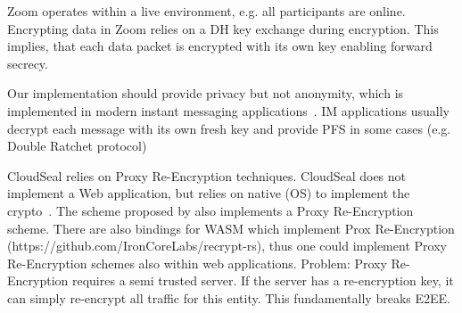 \documentclass[../main.tex]{subfiles}
\begin{document}
Zoom operates within a live environment, e.g. all participants are online. 
Encrypting data in Zoom relies on a DH key exchange during encryption. 
This implies, that each data packet is encrypted with its own key enabling forward secrecy.~\cite{Isobe2021}

Our implementation should provide privacy but not anonymity, which is implemented in modern instant messaging applications~\cite{Akinbi2021}. 
IM applications usually decrypt each message with its own fresh key and provide PFS in some cases (e.g. Double Ratchet protocol)

CloudSeal relies on Proxy Re-Encryption techniques.
CloudSeal does not implement a Web application, but relies on native (OS) to implement the crypto~\cite{Xiong2012}.
The scheme proposed by \citeauthor{Hoerandner2020} also implements a Proxy Re-Encryption scheme. \cite{Hoerandner2020}
There are also bindings for WASM which implement Prox Re-Encryption (https://github.com/IronCoreLabs/recrypt-rs), thus one could implement Proxy Re-Encryption schemes also within web applications.
Problem: Proxy Re-Encryption requires a semi trusted server.
If the server has a re-encryption key, it can simply re-encrypt all traffic for this entity.
This fundamentally breaks E2EE.
\end{document}
